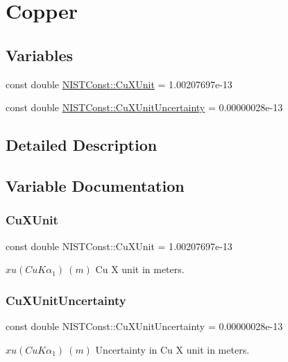 \hypertarget{group___n_i_s_t_const-_copper}{}\section{Copper}
\label{group___n_i_s_t_const-_copper}
\subsection*{Variables}
\begin{DoxyCompactItemize}
\item 
const double \hyperlink{group___n_i_s_t_const-_copper_gaefed00ac64123e598d5c20abac22f22f}{N\+I\+S\+T\+Const\+::\+Cu\+X\+Unit} = 1.\+00207697e-\/13
\item 
const double \hyperlink{group___n_i_s_t_const-_copper_ga288d0a3002970fa7dc68df68e182f508}{N\+I\+S\+T\+Const\+::\+Cu\+X\+Unit\+Uncertainty} = 0.\+00000028e-\/13
\end{DoxyCompactItemize}


\subsection{Detailed Description}


\subsection{Variable Documentation}
\mbox{\label{group___n_i_s_t_const-_copper_gaefed00ac64123e598d5c20abac22f22f}} 
\subsubsection{\texorpdfstring{Cu\+X\+Unit}{CuXUnit}}
{\footnotesize\ttfamily const double N\+I\+S\+T\+Const\+::\+Cu\+X\+Unit = 1.\+00207697e-\/13}

$xu(CuK\alpha_1) \ (m)$ Cu X unit in meters. \mbox{\label{group___n_i_s_t_const-_copper_ga288d0a3002970fa7dc68df68e182f508}} 
\subsubsection{\texorpdfstring{Cu\+X\+Unit\+Uncertainty}{CuXUnitUncertainty}}
{\footnotesize\ttfamily const double N\+I\+S\+T\+Const\+::\+Cu\+X\+Unit\+Uncertainty = 0.\+00000028e-\/13}

$xu(CuK\alpha_1) \ (m)$ Uncertainty in Cu X unit in meters. 